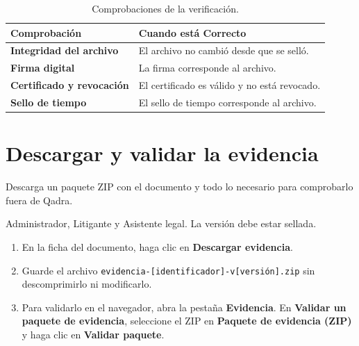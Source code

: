\begin{table}[H]
  \centering
  \caption{Comprobaciones de la verificación.}\label{tab:comprobaciones}
  \begin{tabularx}{\textwidth}{L{4.2cm} Y}
    \toprule
    \textbf{Comprobación} & \textbf{Cuando está \textbf{Correcto}} \\
    \midrule
    \textbf{Integridad del archivo}    & El archivo no cambió desde que se selló. \\
    \textbf{Firma digital}             & La firma corresponde al archivo. \\
    \textbf{Certificado y revocación}  & El certificado es válido y no está revocado. \\
    \textbf{Sello de tiempo}           & El sello de tiempo corresponde al archivo. \\
    \bottomrule
  \end{tabularx}
\end{table}


\section{Descargar y validar la evidencia}\label{sec:descargar-evidencia}

\paraque Descarga un paquete ZIP con el documento y todo lo necesario para
comprobarlo fuera de Qadra.

\disponible Administrador, Litigante y Asistente legal. La versión debe
estar sellada.

\pasos
\begin{enumerate}
  \item En la ficha del documento, haga clic en
        \textbf{Descargar evidencia}.
  \item Guarde el archivo \texttt{evidencia-[identificador]-v[versión].zip}
        sin descomprimirlo ni modificarlo.
  \item Para validarlo en el navegador, abra la pestaña \textbf{Evidencia}.
        En \textbf{Validar un paquete de evidencia}, seleccione el ZIP en
        \textbf{Paquete de evidencia (ZIP)} y haga clic en
        \textbf{Validar paquete}.
\end{enumerate}

